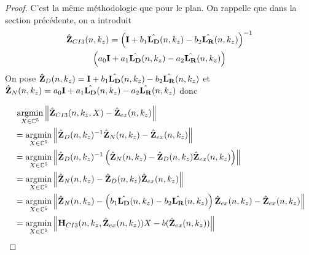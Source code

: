     \begin{proof}
      C'est la même méthodologie que pour le plan.
      On rappelle que dans la section précédente, on a introduit
      \begin{multline*}
        \hat{\mathbf{Z}}_{CI3}(n,k_z) = \left(\mathbf{I} + b_1 \hat{\mathbf{L_D}}(n,k_z) - b_2 \hat{\mathbf{L_R}}(n,k_z) \right)^{-1}\\\left(a_0 \mathbf{I} + a_1 {\hat{\mathbf{L_D}}(n,k_z)} - a_2 {\hat{\mathbf{L_R}}(n,k_z)}\right)
      \end{multline*}
      On pose \(\hat{\mathbf{Z}}_D(n,k_z) = \mathbf{I} + b_1 \hat{\mathbf{L_D}}(n,k_z) - b_2 \hat{\mathbf{L_R}}(n,k_z)\) et \(\hat{\mathbf{Z}}_N(n,k_z) = a_0 \mathbf{I} + a_1 {\hat{\mathbf{L_D}}(n,k_z)} - a_2 {\hat{\mathbf{L_R}}(n,k_z)}\) donc

      \begin{align*}
      &{}~ {\underset{X\in\mathbb C^5}{\operatorname{argmin}}} \left\lVert\hat{\mathbf{Z}}_{CI3}(n,k_z,X) - \hat{\mathbf{Z}}_{ex}(n,k_z)\right\rVert
      \\
      & = {\underset{X\in\mathbb C^5}{\operatorname{argmin}}} \left\lVert\hat{\mathbf{Z}}_D(n,k_z)^{-1}\hat{\mathbf{Z}}_N(n,k_z) - \hat{\mathbf{Z}}_{ex}(n,k_z) \right\rVert
      \\
      &= {\underset{X\in\mathbb C^5}{\operatorname{argmin}}} \left\lVert\hat{\mathbf{Z}}_D(n,k_z)^{-1}\left(\hat{\mathbf{Z}}_N(n,k_z) - \hat{\mathbf{Z}}_D(n,k_z)\hat{\mathbf{Z}}_{ex}(n,k_z)\right) \right\rVert
      \\
      &= {\underset{X\in\mathbb C^5}{\operatorname{argmin}}} \left\lVert\hat{\mathbf{Z}}_N(n,k_z) - \hat{\mathbf{Z}}_D(n,k_z)\hat{\mathbf{Z}}_{ex}(n,k_z)\right\rVert
      \\
      &= {\underset{X\in\mathbb C^5}{\operatorname{argmin}}} \left\lVert\hat{\mathbf{Z}}_N(n,k_z) - \left(b_1 \hat{\mathbf{L_D}}(n,k_z) - b_2 \hat{\mathbf{L_R}}(n,k_z)\right)\hat{\mathbf{Z}}_{ex}(n,k_z) - \hat{\mathbf{Z}}_{ex}(n,k_z) \right\rVert
      \\
      &= {\underset{X\in\mathbb C^5}{\operatorname{argmin}}} \left\lVert\mathbf{H}_{CI3}(n,k_z,\hat{\mathbf{Z}}_{ex}(n,k_z))X - b(\hat{\mathbf{Z}}_{ex}(n,k_z))\right\rVert
      \end{align*}
    \end{proof}

